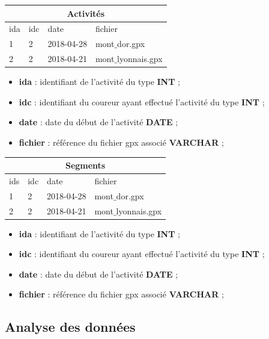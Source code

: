 \bigskip

\begin{minipage}{0.5\textwidth}

\begin{tabular}{llll}
\toprule
\multicolumn{4}{c}{Activités}\\
\midrule
ida &  idc & date & fichier \\
\midrule
1&2& 2018-04-28 & mont$\_$dor.gpx \\
2&2& 2018-04-21 & mont$\_$lyonnais.gpx \\
\bottomrule
\end{tabular}
\end{minipage}
\begin{minipage}{0.5\textwidth}
\begin{itemize}
\item \textbf{ida} : identifiant de l'activité du type \textbf{INT} ;
\item \textbf{idc} : identifiant du coureur ayant effectué l'activité du type \textbf{INT} ;
\item \textbf{date} : date du début de l'activité \textbf{DATE} ;
\item \textbf{fichier} : référence du fichier gpx associé \textbf{VARCHAR} ;
\end{itemize}

\end{minipage}


\bigskip

\begin{minipage}{0.5\textwidth}

\begin{tabular}{llll}
\toprule
\multicolumn{4}{c}{Segments}\\
\midrule
ids &  idc & date & fichier \\
\midrule
1&2& 2018-04-28 & mont$\_$dor.gpx \\
2&2& 2018-04-21 & mont$\_$lyonnais.gpx \\
\bottomrule
\end{tabular}
\end{minipage}
\begin{minipage}{0.5\textwidth}
\begin{itemize}
\item \textbf{ida} : identifiant de l'activité du type \textbf{INT} ;
\item \textbf{idc} : identifiant du coureur ayant effectué l'activité du type \textbf{INT} ;
\item \textbf{date} : date du début de l'activité \textbf{DATE} ;
\item \textbf{fichier} : référence du fichier gpx associé \textbf{VARCHAR} ;
\end{itemize}

\end{minipage}



\subsection{Analyse des données}